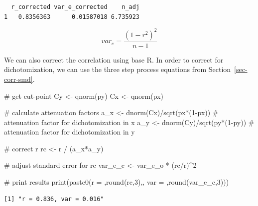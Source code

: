 \documentclass[
  letterpaper,
  DIV=11,
  numbers=noendperiod]{scrreprt}
\newenvironment{Shaded}{\begin{snugshade}}{\end{snugshade}}
\newcommand{\CommentTok}[1]{\textcolor[rgb]{0.37,0.37,0.37}{#1}}
\newcommand{\DecValTok}[1]{\textcolor[rgb]{0.68,0.00,0.00}{#1}}
\newcommand{\FunctionTok}[1]{\textcolor[rgb]{0.28,0.35,0.67}{#1}}
\newcommand{\NormalTok}[1]{\textcolor[rgb]{0.00,0.23,0.31}{#1}}
\newcommand{\OtherTok}[1]{\textcolor[rgb]{0.00,0.23,0.31}{#1}}
\newcommand{\SpecialCharTok}[1]{\textcolor[rgb]{0.37,0.37,0.37}{#1}}
\newcommand{\StringTok}[1]{\textcolor[rgb]{0.13,0.47,0.30}{#1}}
\begin{document}
\begin{verbatim}
  r_corrected var_e_corrected    n_adj
1   0.8356363      0.01587018 6.735923
\end{verbatim}

\[
var_{e}=\frac{(1-r^{2})^{2}}{n-1}
\]

We can also correct the correlation using base R. In order to correct
for dichotomization, we can use the three step process equations from
Section~\ref{sec-corr-smd}.

\begin{Shaded}
\begin{Highlighting}[]
\CommentTok{\# get cut{-}point}
\NormalTok{Cy }\OtherTok{\textless{}{-}} \FunctionTok{qnorm}\NormalTok{(py)}
\NormalTok{Cx }\OtherTok{\textless{}{-}} \FunctionTok{qnorm}\NormalTok{(px)}

\CommentTok{\# calculate attenuation factors}
\NormalTok{a\_x }\OtherTok{\textless{}{-}} \FunctionTok{dnorm}\NormalTok{(Cx)}\SpecialCharTok{/}\FunctionTok{sqrt}\NormalTok{(px}\SpecialCharTok{*}\NormalTok{(}\DecValTok{1}\SpecialCharTok{{-}}\NormalTok{px)) }\CommentTok{\# attenuation factor for dichotomization in x}
\NormalTok{a\_y }\OtherTok{\textless{}{-}} \FunctionTok{dnorm}\NormalTok{(Cy)}\SpecialCharTok{/}\FunctionTok{sqrt}\NormalTok{(py}\SpecialCharTok{*}\NormalTok{(}\DecValTok{1}\SpecialCharTok{{-}}\NormalTok{py)) }\CommentTok{\# attenuation factor for dichotomization in y}

\CommentTok{\# correct r}
\NormalTok{rc }\OtherTok{\textless{}{-}}\NormalTok{ r }\SpecialCharTok{/}\NormalTok{ (a\_x}\SpecialCharTok{*}\NormalTok{a\_y)}

\CommentTok{\# adjust standard error for rc}
\NormalTok{var\_e\_c }\OtherTok{\textless{}{-}}\NormalTok{ var\_e\_o }\SpecialCharTok{*}\NormalTok{ (rc}\SpecialCharTok{/}\NormalTok{r)}\SpecialCharTok{\^{}}\DecValTok{2}

\CommentTok{\# print results}
\FunctionTok{print}\NormalTok{(}\FunctionTok{paste0}\NormalTok{(}\StringTok{\textquotesingle{}r = \textquotesingle{}}\NormalTok{,}\FunctionTok{round}\NormalTok{(rc,}\DecValTok{3}\NormalTok{),}\StringTok{\textquotesingle{}, var = \textquotesingle{}}\NormalTok{,}\FunctionTok{round}\NormalTok{(var\_e\_c,}\DecValTok{3}\NormalTok{)))}
\end{Highlighting}
\end{Shaded}

\begin{verbatim}
[1] "r = 0.836, var = 0.016"
\end{verbatim}
\end{document}
